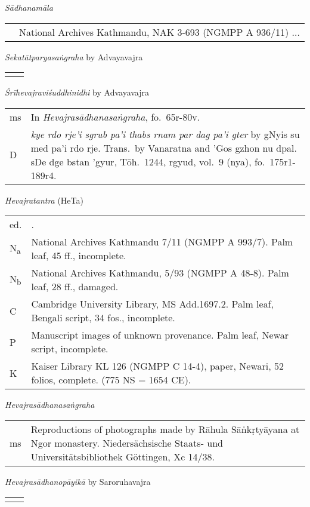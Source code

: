 \documentclass[12pt,twoside]{article}
\newcommand{\mybibexclude}[1]{\addtocategory{fullcited}{#1}}
\begin{document}
\noindent\emph{Sādhanamāla} 
\noindent\begin{longtable}{ p{} p{} }
	& National Archives Kathmandu, NAK 3-693 (NGMPP A 936/11) ... 
\end{longtable}

\noindent\emph{Sekatātparyasaṅgraha} by Advayavajra
\noindent\begin{longtable}{ p{} p{} }
	& \cite[403–414]{mathes2015} 
\end{longtable}

\noindent\emph{Śrīhevajraviśuddhinidhi} by Advayavajra
\noindent\begin{longtable}{ p{} p{} }
	ms & In \emph{Hevajrasādhanasaṅgraha}, fo.\ 65r-80v. \\
	D & \emph{kye rdo rje'i sgrub pa'i thabs rnam par dag pa'i gter} by gNyis su med pa'i rdo rje. Trans.\ by Vanaratna and 'Gos gzhon nu dpal. sDe dge bstan 'gyur, Tōh.\ 1244, rgyud, vol.\ 9 (nya), fo.\ 175r1-189r4. 
\end{longtable}

\noindent\emph{Hevajratantra} (HeTa) 
\noindent\begin{longtable}{ p{} p{} }
	ed. & \fullcite*{snellgrove1959}.\mybibexclude{snellgrove1959} \\
	N\textsubscript{a} & National Archives Kathmandu 7/11 (NGMPP A 993/7). Palm leaf, 45 ff., incomplete. \\
	N\textsubscript{b} & National Archives Kathmandu, 5/93 (NGMPP A 48-8). Palm leaf, 28 ff., damaged. \\
	C & Cambridge University Library, MS Add.1697.2. Palm leaf, Bengali script, 34 fos., incomplete. \\
	P & Manuscript images of unknown provenance. Palm leaf, Newar script, incomplete. \\
	K & Kaiser Library KL 126 (NGMPP C 14-4), paper, Newari, 52 folios, complete. (775 NS = 1654 CE). 
\end{longtable}

\noindent\emph{Hevajrasādhanasaṅgraha}
\noindent\begin{longtable}{ p{} p{} }
	ms & Reproductions of photographs made by Rāhula Sāṅkṛtyāyana at Ngor monastery. Niedersächsische Staats- und Universitätsbibliothek Göttingen, Xc 14/38. 
\end{longtable}

\noindent\emph{Hevajrasādhanopāyikā} by Saroruhavajra
\noindent\begin{longtable}{ p{} p{} }
	& \textcite*[vo.\ 1 pp.\ 99–121]{gerloff2020} 
\end{longtable}
\end{document}
